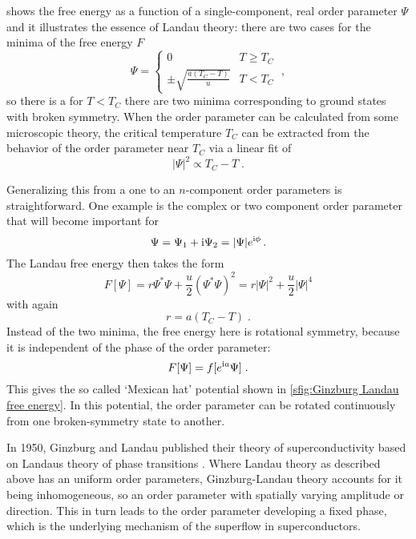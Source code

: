 \documentclass[../notes.tex]{subfiles}
\begin{document}
 shows the free energy as a function of a single-component, real order parameter \(\Psi\) and it illustrates the essence of Landau theory: there are two cases for the minima of the free energy \(F\)
\begin{equation}
	\Psi = \begin{cases}
		0 & T \geq T_C \\
		\pm \sqrt{\frac{a (T_C - T)}{u}} & T < T_C
	\end{cases} \;,
\end{equation}
so there is a for \(T < T_C\) there are two minima corresponding to ground states with broken symmetry.
When the order parameter can be calculated from some microscopic theory, the critical temperature \(T_C\) can be extracted from the behavior of the order parameter near \(T_C\) via a linear fit of
\begin{equation}
	\vert \Psi \vert^2 \propto T_C - T \;.
\end{equation}

Generalizing this from a one to an \(n\)-component order parameters is straightforward.
One example is the complex or two component order parameter that will become important for 
\begin{equation}
	\Psi = \Psi_1 + \mathrm{i} \Psi_2 = \vert \Psi \vert e^{\mathrm{i} \phi} \,.
\end{equation}
The Landau free energy then takes the form
\begin{equation}
	F [\Psi] = r \Psi^* \Psi + \frac{u}{2} (\Psi^* \Psi)^2 = r \vert \Psi \vert^2 + \frac{u}{2} \vert \Psi \vert^4
\end{equation}
with again
\begin{equation}
	r = a(T_C - T) \;.
\end{equation}
Instead of the two minima, the free energy here is rotational symmetry, because it is independent of the phase of the order parameter: 
\begin{equation}
	F [\Psi] = f [e^{\mathrm{i} a} \Psi] \;.
\end{equation}
This gives the so called `Mexican hat' potential shown in \cref{sfig:Ginzburg Landau free energy}.
In this potential, the order parameter can be rotated continuously from one broken-symmetry state to another.

In 1950, Ginzburg and Landau published their theory of superconductivity based on Landaus theory of phase transitions \cite{ginzburgTheorySuperconductivity1950}.
Where Landau theory as described above has an uniform order parameters, Ginzburg-Landau theory accounts for it being inhomogeneous, so an order parameter with spatially varying amplitude or direction.
This in turn leads to the order parameter developing a fixed phase, which is the underlying mechanism of the superflow in superconductors.
\end{document}

